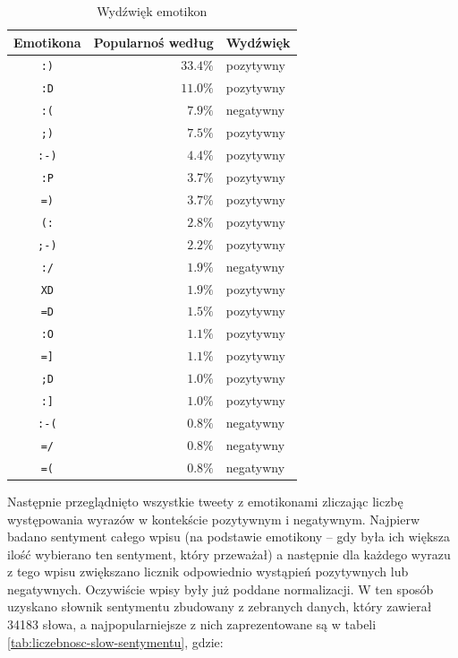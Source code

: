 \begin{table}[ht!]  
\begin{center}  
\begin{tabular}{|c|r|l|}
\hline
Emotikona & Popularnoś według \cite{EmoticonAnalysisTwitter} &
Wydźwięk \\ \hline
\texttt{:)} & $33.4\%$ & pozytywny \\ \hline
\texttt{:D} & $11.0\%$ & pozytywny \\ \hline
\texttt{:(} & $7.9\%$ & negatywny \\ \hline
\texttt{;)} & $7.5\%$ & pozytywny \\ \hline
\texttt{:-)} & $4.4\%$ & pozytywny \\ \hline
\texttt{:P} & $3.7\%$ & pozytywny \\ \hline
\texttt{=)} & $3.7\%$ & pozytywny \\ \hline
\texttt{(:} & $2.8\%$ & pozytywny \\ \hline
\texttt{;-)} & $2.2\%$ & pozytywny \\ \hline
\texttt{:/} & $1.9\%$ & negatywny \\ \hline
\texttt{XD} & $1.9\%$ & pozytywny \\ \hline
\texttt{=D} & $1.5\%$ & pozytywny \\ \hline
\texttt{:O} & $1.1\%$ & pozytywny \\ \hline
\texttt{=]} & $1.1\%$ & pozytywny \\ \hline
\texttt{;D} & $1.0\%$ & pozytywny \\ \hline
\texttt{:]} & $1.0\%$ & pozytywny \\ \hline
\texttt{:-(} & $0.8\%$ & negatywny \\ \hline
\texttt{=/} & $0.8\%$ & negatywny \\ \hline
\texttt{=(} & $0.8\%$ & negatywny \\ \hline
\end{tabular} 
\end{center} 
\caption{Wydźwięk emotikon}
\label{tab:wydzwiek-emotikon}
\end{table}

Następnie przeglądnięto wszystkie tweety z emotikonami zliczając liczbę
występowania wyrazów w kontekście pozytywnym i negatywnym.
Najpierw badano sentyment całego wpisu (na podstawie emotikony -- gdy była ich
większa ilość wybierano ten sentyment, który przeważał) a następnie dla każdego
wyrazu z tego wpisu zwiększano licznik odpowiednio wystąpień pozytywnych lub
negatywnych. Oczywiście wpisy były już poddane normalizacji.
W ten sposób uzyskano słownik sentymentu zbudowany z zebranych danych, który
zawierał 34183 słowa, a najpopularniejsze z nich zaprezentowane są w tabeli
\ref{tab:liczebnosc-slow-sentymentu}, gdzie:

